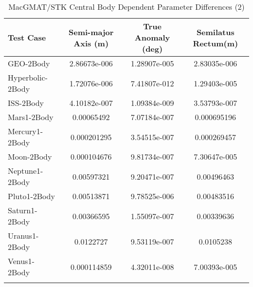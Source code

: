 \begin{table}[htbp!]
\centering
\caption{ MacGMAT/STK Central Body Dependent Parameter Differences (2)}
      \begin{tabular}{lccc}
      \hline\hline
          Test Case & Semi-major Axis (m) & True Anomaly (deg) & Semilatus Rectum(m) \\
         \hline
         GEO-2Body & 2.86673e-006 & 1.28907e-005 & 2.83035e-006 \\
         Hyperbolic-2Body & 1.72076e-006 & 7.41807e-012 & 1.29403e-005 \\
         ISS-2Body & 4.10182e-007 & 1.09384e-009 & 3.53793e-007 \\
         Mars1-2Body & 0.00065492 & 7.07184e-007 & 0.000695196 \\
         Mercury1-2Body & 0.000201295 & 3.54515e-007 & 0.000269457 \\
         Moon-2Body & 0.000104676 & 9.81734e-007 & 7.30647e-005 \\
         Neptune1-2Body & 0.00597321 & 9.20471e-007 & 0.00496463 \\
         Pluto1-2Body & 0.00513871 & 9.78525e-006 & 0.00483516 \\
         Saturn1-2Body & 0.00366595 & 1.55097e-007 & 0.00339636 \\
         Uranus1-2Body & 0.0122727 & 9.53119e-007 & 0.0105238 \\
         Venus1-2Body & 0.000114859 & 4.32011e-008 & 7.00393e-005 \\
      \hline\hline
      \label{Table: MacGMAT-STK CB Parameters Set 2} 
\end{tabular}
\end{table}
